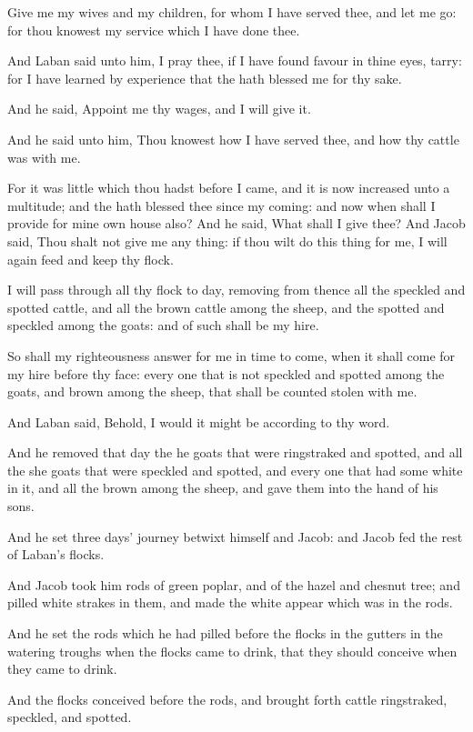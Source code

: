 \verse Give me my wives and my children, for whom I have served thee,
and let me go: for thou knowest my service which I have done thee.

\verse And Laban said unto him, I pray thee, if I have found favour in
thine eyes, tarry: for I have learned by experience that the \LORD hath
blessed me for thy sake.

\verse And he said, Appoint me thy wages, and I will give it.

\verse And he said unto him, Thou knowest how I have served thee, and
how thy cattle was with me.

\verse For it was little which thou hadst before I came, and it is now
increased unto a multitude; and the \LORD hath blessed thee since my
coming: and now when shall I provide for mine own house also?  \verse
And he said, What shall I give thee? And Jacob said, Thou shalt not
give me any thing: if thou wilt do this thing for me, I will again
feed and keep thy flock.

\verse I will pass through all thy flock to day, removing from thence
all the speckled and spotted cattle, and all the brown cattle among
the sheep, and the spotted and speckled among the goats: and of such
shall be my hire.

\verse So shall my righteousness answer for me in time to come, when it
shall come for my hire before thy face: every one that is not speckled
and spotted among the goats, and brown among the sheep, that shall be
counted stolen with me.

\verse And Laban said, Behold, I would it might be according to thy
word.

\verse And he removed that day the he goats that were ringstraked and
spotted, and all the she goats that were speckled and spotted, and
every one that had some white in it, and all the brown among the
sheep, and gave them into the hand of his sons.

\verse And he set three days' journey betwixt himself and Jacob: and
Jacob fed the rest of Laban's flocks.

\verse And Jacob took him rods of green poplar, and of the hazel and
chesnut tree; and pilled white strakes in them, and made the white
appear which was in the rods.

\verse And he set the rods which he had pilled before the flocks in the
gutters in the watering troughs when the flocks came to drink, that
they should conceive when they came to drink.

\verse And the flocks conceived before the rods, and brought forth
cattle ringstraked, speckled, and spotted.

